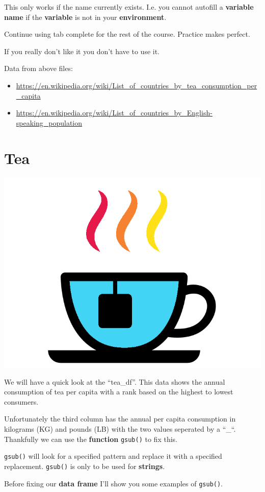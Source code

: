 \documentclass[]{book}
\providecommand{\tightlist}{%
  \setlength{\itemsep}{0pt}\setlength{\parskip}{0pt}}
\begin{document}
This only works if the name currently exists. I.e. you cannot autofill a
\textbf{variable name} if the \textbf{variable} is not in your
\textbf{environment}.

Continue using tab complete for the rest of the course. Practice makes
perfect.

If you really don't like it you don't have to use it.

Data from above files:

\begin{itemize}
\tightlist
\item
  \url{https://en.wikipedia.org/wiki/List_of_countries_by_tea_consumption_per_capita}
\item
  \url{https://en.wikipedia.org/wiki/List_of_countries_by_English-speaking_population}
\end{itemize}

\section{Tea}\label{tea}

\begin{center}\includegraphics[width=0.2\linewidth]{figures/tea} \end{center}

We will have a quick look at the ``tea\_df''. This data shows the annual
consumption of tea per capita with a rank based on the highest to lowest
consumers.

Unfortunately the third column has the annual per capita consumption in
kilograms (KG) and pounds (LB) with the two values seperated by a
``\_``. Thankfully we can use the \textbf{function} \texttt{gsub()} to
fix this.

\texttt{gsub()} will look for a specified pattern and replace it with a
specified replacement. \texttt{gsub()} is only to be used for
\textbf{strings}.

Before fixing our \textbf{data frame} I'll show you some examples of
\texttt{gsub()}.
\end{document}
